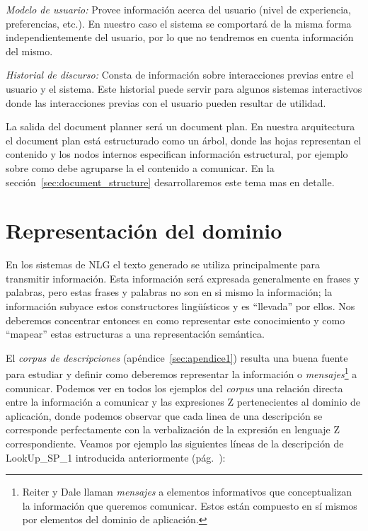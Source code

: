 \bigskip
\noindent
\emph{Modelo de usuario:} Provee información acerca del usuario (nivel de experiencia, preferencias, etc.). En nuestro caso el sistema se comportará de la misma forma independientemente del usuario, por lo que no tendremos en cuenta información del mismo.

\bigskip
\noindent
\emph{Historial de discurso:} Consta de información sobre interacciones previas entre el usuario y el sistema. Este historial puede servir para algunos sistemas interactivos donde las interacciones previas con el usuario pueden resultar de utilidad. 

\bigskip
La salida del document planner será un document plan. En nuestra arquitectura el document plan está estructurado como un árbol, donde las hojas representan el contenido y los nodos internos especifican información estructural, por ejemplo sobre como debe agruparse la el contenido a comunicar. En la sección~\ref{sec:document_structure} desarrollaremos este tema mas en detalle.

\section{Representación del dominio}

En los sistemas de NLG el texto generado se utiliza principalmente para transmitir información. Esta información será expresada generalmente en frases y palabras, pero estas  frases y palabras no son en si mismo la información; la información subyace estos constructores lingüísticos y es ``llevada'' por ellos. Nos deberemos concentrar entonces en como representar este conocimiento y como ``mapear'' estas estructuras a una representación semántica. 


El \emph{corpus de descripciones} (apéndice~\ref{sec:apendice1}) resulta una buena fuente para estudiar y definir como deberemos representar la información o \emph{mensajes}\footnote{Reiter y Dale llaman \emph{mensajes} a elementos informativos que conceptualizan la información que queremos comunicar. Estos están compuesto en sí mismos por elementos del dominio de aplicación.} a comunicar. Podemos ver en todos los ejemplos del \emph{corpus} una relación directa entre la información a comunicar y las expresiones Z pertenecientes al dominio de aplicación, donde podemos observar que cada linea de una descripción se corresponde perfectamente con la verbalización de la expresión en lenguaje Z correspondiente. Veamos por ejemplo las siguientes líneas de la descripción de LookUp\_SP\_1 introducida anteriormente (pág.~\pageref{fig:ej_desc_lookup_sp_1}):

